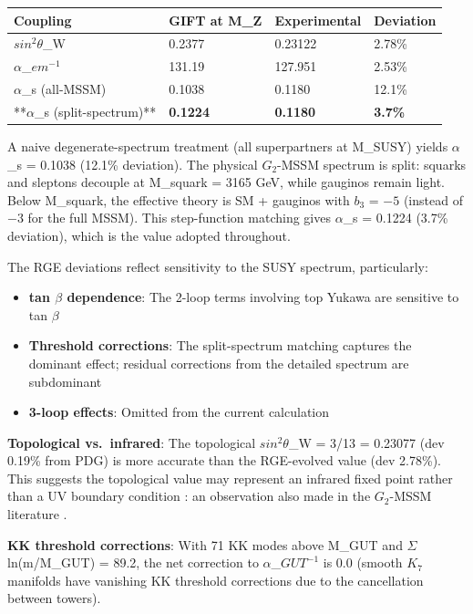 \documentclass[11pt,a4paper]{article}
\begin{document}
\begin{longtable}[]{@{}llll@{}}
\toprule\noalign{}
Coupling & GIFT at M\_Z & Experimental & Deviation \\
\midrule\noalign{}
\endhead
\bottomrule\noalign{}
\endlastfoot
\(sin^{2} \theta\)\_W & 0.2377 & 0.23122 & 2.78\% \\
\(\alpha\)\_\(em^{-1}\) & 131.19 & 127.951 & 2.53\% \\
\(\alpha\)\_s (all-MSSM) & 0.1038 & 0.1180 & 12.1\% \\
**\(\alpha\)\_s (split-spectrum)** & \textbf{0.1224} & \textbf{0.1180} &
\textbf{3.7\%} \\
\end{longtable}


A naive degenerate-spectrum treatment (all superpartners at M\_SUSY)
yields \(\alpha\)\_s = 0.1038 (12.1\% deviation). The physical
\(G_{2}\)-MSSM spectrum is split: squarks and sleptons decouple at
M\_squark = 3165 GeV, while gauginos remain light. Below M\_squark, the
effective theory is SM + gauginos with \(b_{3}\) = \(- 5\) (instead of
\(- 3\) for the full MSSM). This step-function matching gives
\(\alpha\)\_s = 0.1224 (3.7\% deviation), which is the value adopted
throughout.

The RGE deviations reflect sensitivity to the SUSY spectrum,
particularly:

\begin{itemize}

\item
  \textbf{tan \(\beta\) dependence}: The 2-loop terms involving top
  Yukawa are sensitive to tan \(\beta\)
\item
  \textbf{Threshold corrections}: The split-spectrum matching captures
  the dominant effect; residual corrections from the detailed spectrum
  are subdominant
\item
  \textbf{3-loop effects}: Omitted from the current calculation
\end{itemize}

\textbf{Topological vs.~infrared}: The topological \(sin^{2} \theta\)\_W
= 3/13 = 0.23077 (dev 0.19\% from PDG) is more accurate than the
RGE-evolved value (dev 2.78\%). This suggests the topological value may
represent an infrared fixed point rather than a UV boundary condition
: an observation also made in the \(G_{2}\)-MSSM literature \cite{33}.

\textbf{KK threshold corrections}: With 71 KK modes above M\_GUT and
\(\Sigma\) ln(m/M\_GUT) = 89.2, the net correction to
\(\alpha\)\_\(GUT^{-1}\) is 0.0 (smooth \(K_{7}\) manifolds have
vanishing KK threshold corrections due to the cancellation between
towers).
\end{document}
